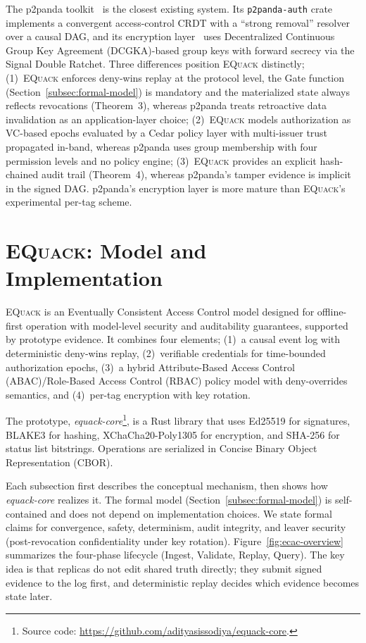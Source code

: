 \documentclass[10pt,journal,compsoc]{IEEEtran}
\newcommand{\equack}{\textsc{EQuack}}
\begin{document}
The p2panda toolkit~\cite{p2panda2024} is the closest existing system. Its \texttt{p2panda-auth} crate~\cite{p2panda_auth2025} implements a convergent access-control CRDT with a ``strong removal'' resolver over a causal DAG, and its encryption layer~\cite{p2panda_encryption2025} uses Decentralized Continuous Group Key Agreement (DCGKA)-based group keys with forward secrecy via the Signal Double Ratchet. Three differences position \equack{} distinctly; (1)~\equack{} enforces deny-wins replay at the protocol level, the Gate function (Section~\ref{subsec:formal-model}) is mandatory and the materialized state always reflects revocations (Theorem~3), whereas p2panda treats retroactive data invalidation as an application-layer choice; (2)~\equack{} models authorization as VC-based epochs evaluated by a Cedar policy layer with multi-issuer trust propagated in-band, whereas p2panda uses group membership with four permission levels and no policy engine; (3)~\equack{} provides an explicit hash-chained audit trail (Theorem~4), whereas p2panda's tamper evidence is implicit in the signed DAG. p2panda's encryption layer is more mature than \equack{}'s experimental per-tag scheme.

\section{\equack{}: Model and Implementation}
\label{sec:ecac-model}

\equack{} is an Eventually Consistent Access Control model designed for offline-first operation with model-level security and auditability guarantees, supported by prototype evidence.
It combines four elements; (1)~a causal event log with deterministic deny-wins replay, (2)~verifiable credentials for time-bounded authorization epochs, (3)~a hybrid Attribute-Based Access Control (ABAC)/Role-Based Access Control (RBAC) policy model with deny-overrides semantics, and (4)~per-tag encryption with key rotation.

The prototype, \textit{equack-core}\footnote{Source code: \url{https://github.com/adityasissodiya/equack-core}.}, is a Rust library that uses Ed25519 for signatures, BLAKE3 for hashing, XChaCha20-Poly1305 for encryption, and SHA-256 for status list bitstrings. Operations are serialized in Concise Binary Object Representation (CBOR).

Each subsection first describes the conceptual mechanism, then
shows how \textit{equack-core} realizes it. The formal model
(Section~\ref{subsec:formal-model}) is self-contained and does not depend on
implementation choices. We state formal claims for convergence, safety, determinism, audit integrity, and leaver security (post-revocation confidentiality under key rotation). Figure~\ref{fig:ecac-overview} summarizes the four-phase lifecycle (Ingest, Validate, Replay, Query). The key idea is that replicas do not edit shared truth directly; they submit signed evidence to the log first, and deterministic replay decides which evidence becomes state later.
\end{document}
